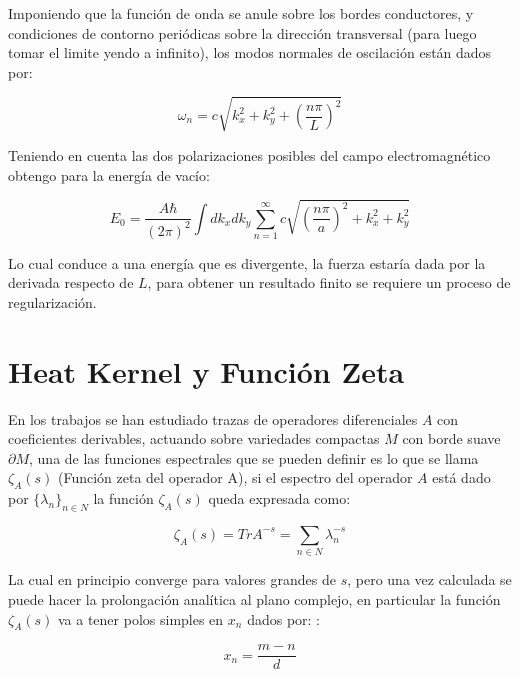 Imponiendo que la función de onda se anule sobre los bordes conductores, y condiciones de contorno periódicas sobre la dirección transversal (para luego tomar el limite yendo a infinito), los modos normales de oscilación están dados por:

\begin{equation}
\omega _n = c \sqrt{ k _x ^2 + k _y ^2 + \left( \frac{n \pi}{L} \right) ^2 }
\end{equation}

Teniendo en cuenta las dos polarizaciones posibles del campo electromagnético obtengo para la energía de vacío:

\begin{equation}
E _0 = \frac{A \hbar }{(2 \pi) ^2} \int dk _x dk _y 
\sum _{n=1} ^{\infty} 
c
\sqrt{
		\left( \frac{n \pi}{a } \right) ^2 + k _x ^2 + k _y ^2
		}
\end{equation}


Lo cual conduce a una energía que es divergente, la fuerza estaría dada por la derivada respecto de $L$, para obtener un resultado finito se requiere un proceso de regularización.

\section{Heat Kernel y Función Zeta}


En los trabajos \cite{ Seeley:1967ea,10.2307/2373309,10.2307/2373312} se han estudiado trazas de operadores diferenciales $A$ con coeficientes derivables, actuando sobre variedades compactas $M$ con borde suave $\partial M$, una de las funciones espectrales que se pueden definir es lo que se llama $\zeta _A (s)$ (Función zeta del operador A), si el espectro del operador $A$ está dado por $ \{ \lambda _n \} _{n \in N}$ la función $\zeta _A (s)$ queda expresada como:


\begin{equation}
\zeta _A (s) = Tr A ^{-s} = \sum _{n \in N}  \lambda _n ^{-s}
\label{funcion.zeta}
\end{equation}

La cual en principio converge para valores grandes de $s$, pero una vez calculada se puede hacer la prolongación analítica al plano complejo, en particular la función $\zeta _A (s)$ va a tener polos simples en $x _n$ dados por:   :

\begin{equation}
x _n = \frac{m-n}{d} 
\label{eq.ceros.zeta}
\end{equation}


